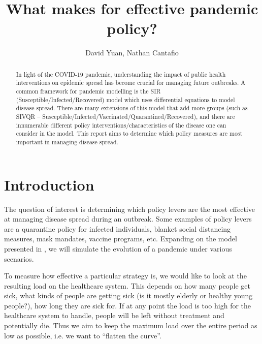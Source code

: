 \documentclass[12pt,a4paper]{article}
\title{What makes for effective pandemic policy?}
\author{David Yuan, Nathan Cantafio}
\date{}  %
\begin{document}
\maketitle

\begin{abstract}
In light of the COVID-19 pandemic, understanding the impact of public health interventions on epidemic spread has become crucial for managing future outbreaks. A common framework for pandemic modelling is the SIR (Susceptible/Infected/Recovered) model which uses differential equations to model disease spread. There are many extensions of this model that add more groups (such as SIVQR -- Susceptible/Infected/Vaccinated/Quarantined/Recovered), and there are innumerable different policy interventions/characteristics of the disease one can consider in the model. This report aims to determine which policy measures are most important in managing disease spread.
\end{abstract} 

\section{Introduction}\label{section1}


The question of interest is determining which policy levers are the most effective at managing disease spread during an outbreak. Some examples of policy levers are a quarantine policy for infected individuals, blanket social distancing measures, mask mandates, vaccine programs, etc. Expanding on the model presented in \cite{TURKYILMAZOGLU2022127429}, we will simulate the evolution of a pandemic under various scenarios. 

To measure how effective a particular strategy is, we would like to look at the resulting load on the healthcare system. This depends on how many people get sick, what kinds of people are getting sick (is it mostly elderly or healthy young people?), how long they are sick for. If at any point the load is too high for the healthcare system to handle, people will be left without treatment and potentially die. Thus we aim to keep the maximum load over the entire period as low as possible, i.e. we want to ``flatten the curve''.
\end{document}
